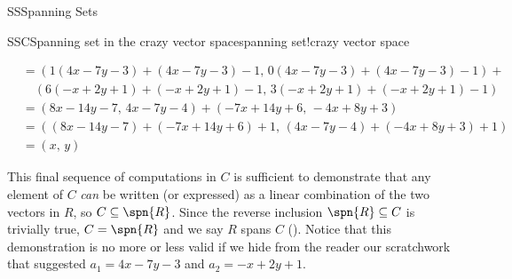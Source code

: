 \begin{subsect}{SS}{Spanning Sets}
\begin{example}{SSC}{Spanning set in the crazy vector space}{spanning set!crazy vector space}
\begin{para}
\begin{align*}
%
&=\left(1(4x-7y-3)+(4x-7y-3)-1,\,0(4x-7y-3)+(4x-7y-3)-1\right)+\\
&\quad\left(6(-x+2y+1)+(-x+2y+1)-1,\,3(-x+2y+1)+(-x+2y+1)-1\right)\\
%
&=(8x-14y-7,\,4x-7y-4)+(-7x+14y+6,\,-4x+8y+3)\\
%
&=((8x-14y-7)+(-7x+14y+6)+1,\,(4x-7y-4)+(-4x+8y+3)+1)\\
%
&=(x,\,y)
%
\end{align*}
\end{para}
%
\begin{para}This final sequence of computations in $C$ is sufficient to demonstrate that any element of $C$ {\em can} be written (or expressed) as a linear combination of the two vectors in $R$, so $C\subseteq\spn{R}$.  Since the reverse inclusion $\spn{R}\subseteq C$ is trivially true, $C=\spn{R}$ and we say $R$ spans $C$ ().  Notice that this demonstration is no more or less valid if we hide from the reader our scratchwork that suggested $a_1=4x-7y-3$ and $a_2=-x+2y+1$.\end{para}
%
\end{example}
%
\end{subsect}
%
